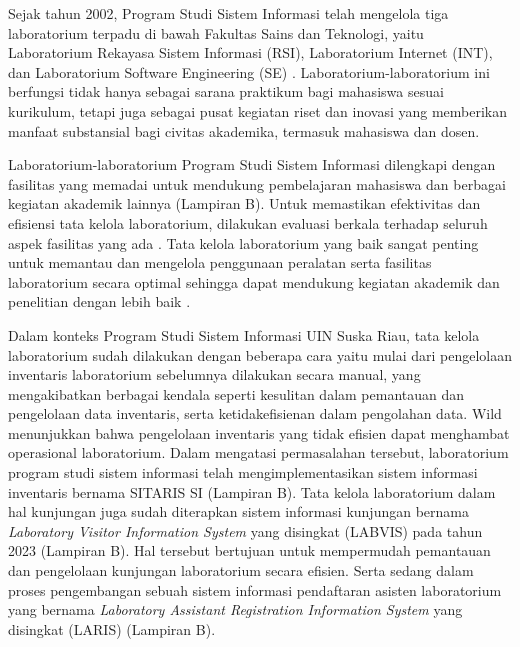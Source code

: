 Sejak tahun 2002, Program Studi Sistem Informasi telah mengelola tiga laboratorium terpadu di bawah Fakultas Sains dan Teknologi, yaitu Laboratorium Rekayasa Sistem Informasi (RSI), Laboratorium Internet (INT), dan Laboratorium Software Engineering (SE) \cite{lab-si-website}. Laboratorium-laboratorium ini berfungsi tidak hanya sebagai sarana praktikum bagi mahasiswa sesuai kurikulum, tetapi juga sebagai pusat kegiatan riset dan inovasi yang memberikan manfaat substansial bagi civitas akademika, termasuk mahasiswa dan dosen.

Laboratorium-laboratorium Program Studi Sistem Informasi dilengkapi dengan fasilitas yang memadai untuk mendukung pembelajaran mahasiswa dan berbagai kegiatan akademik lainnya (Lampiran B). Untuk memastikan efektivitas dan efisiensi tata kelola laboratorium, dilakukan evaluasi berkala terhadap seluruh aspek fasilitas yang ada \cite{lab-si-website}. Tata kelola laboratorium yang baik sangat penting untuk memantau dan mengelola penggunaan peralatan serta fasilitas laboratorium secara optimal sehingga dapat mendukung kegiatan akademik dan penelitian dengan lebih baik \cite{dongapure2024good}.

Dalam konteks Program Studi Sistem Informasi UIN Suska Riau, tata kelola laboratorium sudah dilakukan dengan beberapa cara yaitu mulai dari pengelolaan inventaris laboratorium sebelumnya dilakukan secara manual, yang mengakibatkan berbagai kendala seperti kesulitan dalam pemantauan dan pengelolaan data inventaris, serta ketidakefisienan dalam pengolahan data. Wild \citeyear{smith2021agile} menunjukkan bahwa pengelolaan inventaris yang tidak efisien dapat menghambat operasional laboratorium. Dalam mengatasi permasalahan tersebut, laboratorium program studi sistem informasi telah mengimplementasikan sistem informasi inventaris bernama SITARIS SI (Lampiran B). Tata kelola laboratorium dalam hal kunjungan juga sudah diterapkan sistem informasi kunjungan bernama \textit{Laboratory Visitor Information System} yang disingkat (LABVIS) pada tahun 2023 (Lampiran B). Hal tersebut bertujuan untuk mempermudah pemantauan dan pengelolaan kunjungan laboratorium secara efisien. Serta sedang dalam proses pengembangan sebuah sistem informasi pendaftaran asisten laboratorium yang bernama \textit{Laboratory Assistant Registration Information System} yang disingkat (LARIS) (Lampiran B).


